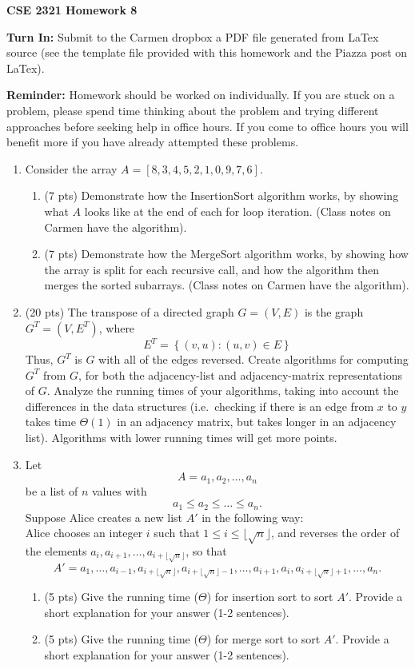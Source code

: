 \documentclass[14pt]{extarticle}
\begin{document}
\textbf{CSE 2321 Homework 8}

\textbf{Turn In:} Submit to the Carmen dropbox a PDF file generated from LaTex source (see the template file provided with this homework and the Piazza post on LaTex).

\textbf{Reminder:} Homework should be worked on individually. If you are stuck on a problem, please spend time thinking about the problem and trying different approaches before seeking help in office hours. If you come to office hours you will benefit more if you have already attempted these problems. 

\begin{enumerate}

\item Consider the array $A = [8, 3, 4, 5, 2, 1, 0, 9, 7, 6]$. 
\begin{enumerate}
\item (7 pts) Demonstrate how the InsertionSort algorithm works, by showing what $A$ looks like at the end of each for loop iteration. (Class notes on Carmen have the algorithm).
\item (7 pts) Demonstrate how the MergeSort algorithm works, by showing how the array is split for each recursive call, and how the algorithm then merges the sorted subarrays. (Class notes on Carmen have the algorithm).
\end{enumerate}

\item (20 pts) The transpose of a directed graph $G = (V, E)$ is the graph $G^T = (V, E^T)$, where
\[
E^T = \left\{ (v, u) : (u, v) \in E \right\}
\]
Thus, $G^T$ is $G$ with all of the edges reversed.
Create algorithms for computing $G^T$ from $G$, for both the adjacency-list and adjacency-matrix representations of $G$. Analyze the running times of your algorithms, taking into account the differences in the data structures (i.e.~checking if there is an edge from $x$ to $y$ takes time $\Theta(1)$ in an adjacency matrix, but takes longer in an adjacency list). Algorithms with lower running times will get more points.


\item Let 
\[
A = a_1, a_2, \ldots, a_n
\]
be a list of $n$ values with
\[
a_1 \leq a_2 \leq \ldots \leq a_n.
\]
Suppose Alice creates a new list $A'$ in the following way:\\
Alice chooses an integer $i$ such that $1 \leq i \leq \lfloor\sqrt{n}\rfloor$, and reverses the order of the elements $a_i, a_{i+1}, \ldots, a_{i + \lfloor\sqrt{n}\rfloor}$, so that
\[
A' = a_1, \ldots, a_{i-1}, a_{i + \lfloor\sqrt{n}\rfloor}, a_{i + \lfloor\sqrt{n}\rfloor - 1}, \ldots, a_{i+1}, a_i, a_{i+ \lfloor\sqrt{n}\rfloor + 1}, \ldots, a_n.
\]
\begin{enumerate}
\item (5 pts) Give the running time ($\Theta$) for insertion sort to sort $A'$. Provide a short explanation for your answer (1-2 sentences).
\item (5 pts) Give the running time ($\Theta$) for merge sort to sort $A'$. Provide a short explanation for your answer (1-2 sentences).
\end{enumerate}



\end{enumerate}
\end{document}
